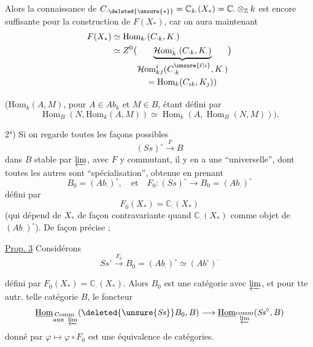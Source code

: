 
Alors la connaissance de $C_{\cdot\deleted{\unsure{\ast}}}=\mathbb C_{k\cdot}(X_{\ast})
=\mathbb C_{\cdot}\otimes_{\mathbb Z}k$ est encore suffisante pour
la construction de $F(X_{\ast})$, car on aura
maintenant
\[
\begin{aligned}
F(X_{\ast})&\simeq\operatorname{Hom}_{k\cdot}(C_{\cdot k},K_{\cdot})\\
&\simeq Z^0\bigl(\underbrace{\mathcal{H}\mathrm{om}^{\cdot}_{k}{}_{\cdot}(C_{\cdot k},K_{\cdot})}_{
\begin{gathered}\mathcal{H}\mathrm{om}^{i}_{k}{}_{j}(C_{\cdot k}^{\unsure{\ell|i}},K_{\cdot})\\
=\operatorname{Hom}_{k}(C_{ik},K_j))\end{gathered}}\bigr)
\end{aligned}
\]

($\mathrm{Hom}_{k}(A,M)$, pour $A\in\mathit{Ab}_{k}$ et $M\in B$, étant
défini par
\[
\operatorname{Hom}_{B}(N,\mathrm{Hom}_{k}(A,M))\simeq
\operatorname{Hom}_{k}(A,\operatorname{Hom}_{B}(N,M))).
\]

2°) Si on regarde toutes les façons possibles
 
\[
(\mathit{Ss})^{\circ}\xrightarrow{F}B
\]
dans $B$ stable par $\varprojlim$, avec $F$ y
commutant, il y en a  une
``universelle'', dont toutes les autres sont
``spécialisation'', obtenue en prenant
\[
B_0=(\mathit{Ab}_{\cdot})^{\circ},\quad\text{et}\quad
F_0:(\mathit{Ss})^{\circ}\longrightarrow B_0=(\mathit{Ab}_{\cdot})^{\circ}
\]
défini par
\[
F_0(X_{\ast})=\mathbb C_{\cdot}(X_{\ast})
\]
(qui dépend de $X_{\ast}$ de façon contravariante
quand $\mathbb C_{\cdot}(X_{\ast})$  comme
objet de $(\mathit{Ab}_{\cdot})^{\circ}$). De façon précise ;

\uline{Prop. 3} Considérons
\[
\mathit{Ss}^{\circ}\xrightarrow{F_0}B_0=(\mathit{Ab}_{\cdot})^{\circ}
\simeq(\mathit{Ab}^{\circ})^{\cdot}
\]

défini par $F_0(X_{\ast})=\mathbb C_{\cdot}(X_{\ast})$. Alors
$B_0$ est une catégorie  avec $\varprojlim$, et
pour tte autr. telle catégorie $B$,
le foncteur
\[
\underline{\operatorname{Hom}}_{\substack{\mathrm{Comm.}\\\mathrm{aux}\ \varprojlim}}
(\deleted{\unsure{\mathit{Ss}}}B_0,B)\longrightarrow
\underline{\operatorname{Hom}}_{\substack{\mathrm{comm}\\\varprojlim}}(\mathit{Ss}^{\circ},B)
\]
donné par $\varphi\longmapsto\varphi\circ F_0$
est une équivalence de catégories.

